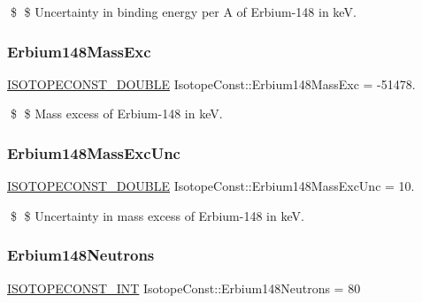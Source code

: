 \$ \$ Uncertainty in binding energy per A of Erbium-\/148 in keV. \mbox{\label{group___isotope_const-_erbium-_er148_ga9e6bfe80bbb96b09b837f6963ef2d0e0}} 
\subsubsection{\texorpdfstring{Erbium148\+Mass\+Exc}{Erbium148MassExc}}
{\footnotesize\ttfamily \mbox{\hyperlink{group___isotope_const-_macros_ga8f45a7272ce02c0b4c65c44636ed719a}{I\+S\+O\+T\+O\+P\+E\+C\+O\+N\+S\+T\+\_\+\+D\+O\+U\+B\+LE}} Isotope\+Const\+::\+Erbium148\+Mass\+Exc = -\/51478.}

\$ \$ Mass excess of Erbium-\/148 in keV. \mbox{\label{group___isotope_const-_erbium-_er148_gaa406d91044e5205e5ca535f2d109cdc9}} 
\subsubsection{\texorpdfstring{Erbium148\+Mass\+Exc\+Unc}{Erbium148MassExcUnc}}
{\footnotesize\ttfamily \mbox{\hyperlink{group___isotope_const-_macros_ga8f45a7272ce02c0b4c65c44636ed719a}{I\+S\+O\+T\+O\+P\+E\+C\+O\+N\+S\+T\+\_\+\+D\+O\+U\+B\+LE}} Isotope\+Const\+::\+Erbium148\+Mass\+Exc\+Unc = 10.}

\$ \$ Uncertainty in mass excess of Erbium-\/148 in keV. \mbox{\label{group___isotope_const-_erbium-_er148_ga40ab99f4a85e51760900f2c54916319e}} 
\subsubsection{\texorpdfstring{Erbium148\+Neutrons}{Erbium148Neutrons}}
{\footnotesize\ttfamily \mbox{\hyperlink{group___isotope_const-_macros_ga5f18360b3e99483a35c32d789e62621c}{I\+S\+O\+T\+O\+P\+E\+C\+O\+N\+S\+T\+\_\+\+I\+NT}} Isotope\+Const\+::\+Erbium148\+Neutrons = 80}

